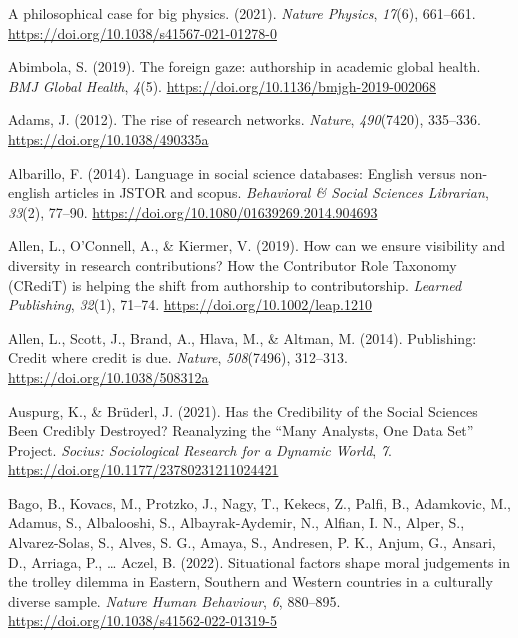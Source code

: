 \documentclass[
  man,floatsintext]{apa7}
\newlength{\cslhangindent}
\newenvironment{CSLReferences}[2] %
 {\begin{list}{}{%
  \setlength{\itemindent}{0pt}
  \setlength{\leftmargin}{0pt}
  \setlength{\parsep}{0pt}
  \ifodd #1
   \setlength{\leftmargin}{\cslhangindent}
   \setlength{\itemindent}{-1\cslhangindent}
  \fi
  \setlength{\itemsep}{#2\baselineskip}}}
 {\end{list}}
\begin{document}
\label{refs}
\begin{CSLReferences}{1}{0}
A philosophical case for big physics. (2021). \emph{Nature Physics}, \emph{17}(6), 661--661. \url{https://doi.org/10.1038/s41567-021-01278-0}

Abimbola, S. (2019). The foreign gaze: authorship in academic global health. \emph{BMJ Global Health}, \emph{4}(5). \url{https://doi.org/10.1136/bmjgh-2019-002068}

Adams, J. (2012). The rise of research networks. \emph{Nature}, \emph{490}(7420), 335--336. \url{https://doi.org/10.1038/490335a}

Albarillo, F. (2014). Language in social science databases: English versus non-english articles in JSTOR and scopus. \emph{Behavioral \& Social Sciences Librarian}, \emph{33}(2), 77--90. \url{https://doi.org/10.1080/01639269.2014.904693}

Allen, L., O'Connell, A., \& Kiermer, V. (2019). How can we ensure visibility and diversity in research contributions? How the Contributor Role Taxonomy (CRediT) is helping the shift from authorship to contributorship. \emph{Learned Publishing}, \emph{32}(1), 71--74. \url{https://doi.org/10.1002/leap.1210}

Allen, L., Scott, J., Brand, A., Hlava, M., \& Altman, M. (2014). Publishing: Credit where credit is due. \emph{Nature}, \emph{508}(7496), 312--313. \url{https://doi.org/10.1038/508312a}

Auspurg, K., \& Brüderl, J. (2021). Has the Credibility of the Social Sciences Been Credibly Destroyed? Reanalyzing the {``}Many Analysts, One Data Set{''} Project. \emph{Socius: Sociological Research for a Dynamic World}, \emph{7}. \url{https://doi.org/10.1177/23780231211024421}

Bago, B., Kovacs, M., Protzko, J., Nagy, T., Kekecs, Z., Palfi, B., Adamkovic, M., Adamus, S., Albalooshi, S., Albayrak-Aydemir, N., Alfian, I. N., Alper, S., Alvarez-Solas, S., Alves, S. G., Amaya, S., Andresen, P. K., Anjum, G., Ansari, D., Arriaga, P., \ldots{} Aczel, B. (2022). Situational factors shape moral judgements in the trolley dilemma in Eastern, Southern and Western countries in a culturally diverse sample. \emph{Nature Human Behaviour}, \emph{6}, 880--895. \url{https://doi.org/10.1038/s41562-022-01319-5}


\end{CSLReferences}
\end{document}
